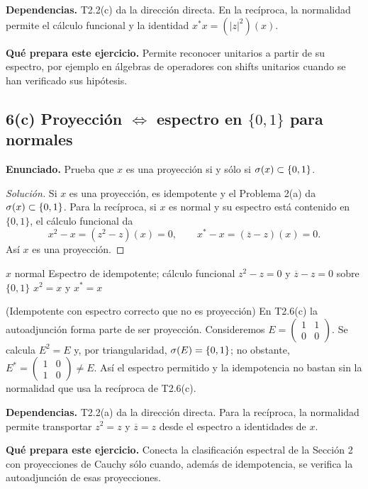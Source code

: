 \noindent\textbf{Dependencias.} T2.2(c) da la dirección directa. En la recíproca, la normalidad permite el cálculo funcional y la identidad $x^*x=(|z|^2)(x)$.

\noindent\textbf{Qué prepara este ejercicio.} Permite reconocer unitarios a partir de su espectro, por ejemplo en álgebras de operadores con shifts unitarios cuando se han verificado sus hipótesis.

\subsection*{6(c) Proyección $\Longleftrightarrow$ espectro en $\{0,1\}$ para normales}

\noindent\textbf{Enunciado.} Prueba que $x$ es una proyección si y sólo si $\sigma(x)\subset\{0,1\}$.

\begin{proof}[Solución]
Si $x$ es una proyección, es idempotente y el Problema 2(a) da
$\sigma(x)\subset\{0,1\}$. Para la recíproca, si $x$ es normal y su espectro está contenido en
$\{0,1\}$, el cálculo funcional da
\[
 x^2-x=(z^2-z)(x)=0,
 \qquad
 x^*-x=(\overline z-z)(x)=0.
\]
Así $x$ es una proyección.
\end{proof}

\proofdiagram
{$x$ normal}
{Espectro de idempotente; cálculo funcional}
{$z^2-z=0$ y $\overline z-z=0$ sobre $\{0,1\}$}
{$x^2=x$ y $x^*=x$}

\begin{cthejemplo}{(Idempotente con espectro correcto que no es proyección)}
En T2.6(c) la autoadjunción forma parte de ser proyección. Consideremos
$E=\begin{pmatrix}1&1\\0&0\end{pmatrix}$.
Se calcula $E^2=E$ y, por triangularidad, $\sigma(E)=\{0,1\}$; no obstante,
$E^*=\begin{pmatrix}1&0\\1&0\end{pmatrix}\ne E$.
Así el espectro permitido y la idempotencia no bastan sin la normalidad que usa la
recíproca de T2.6(c).
\end{cthejemplo}

\noindent\textbf{Dependencias.} T2.2(a) da la dirección directa. Para la recíproca, la normalidad permite transportar $z^2=z$ y $\overline z=z$ desde el espectro a identidades de $x$.

\noindent\textbf{Qué prepara este ejercicio.} Conecta la clasificación espectral de la Sección 2 con proyecciones de Cauchy sólo cuando, además de idempotencia, se verifica la autoadjunción de esas proyecciones.

